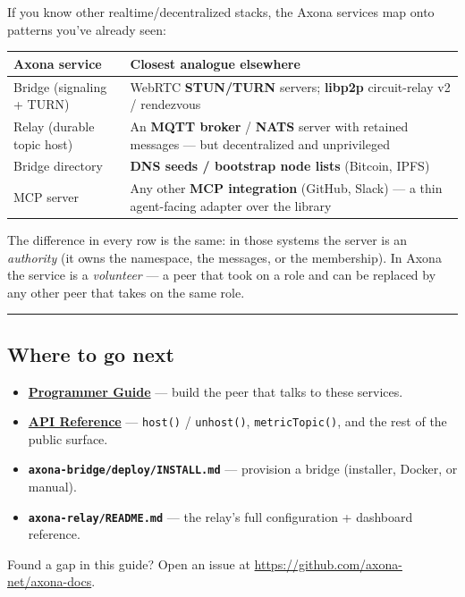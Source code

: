 \documentclass[
  nobib]{tufte-handout}
\newcounter{none} %
\providecommand{\tightlist}{%
  \setlength{\itemsep}{0pt}\setlength{\parskip}{0pt}}
\begin{document}
If you know other realtime/decentralized stacks, the Axona services map
onto patterns you've already seen:

{\def\LTcaptype{none} %
\begin{longtable}[]{@{}
  >{\raggedright\arraybackslash}p{}
  >{\raggedright\arraybackslash}p{}@{}}
\toprule\noalign{}
\begin{minipage}[b]{\linewidth}\raggedright
Axona service
\end{minipage} & \begin{minipage}[b]{\linewidth}\raggedright
Closest analogue elsewhere
\end{minipage} \\
\midrule\noalign{}
\endhead
\bottomrule\noalign{}
\endlastfoot
Bridge (signaling + TURN) & WebRTC \textbf{STUN/TURN} servers;
\textbf{libp2p} circuit-relay v2 / rendezvous \\
Relay (durable topic host) & An \textbf{MQTT broker} / \textbf{NATS}
server with retained messages --- but decentralized and unprivileged \\
Bridge directory & \textbf{DNS seeds / bootstrap node lists} (Bitcoin,
IPFS) \\
MCP server & Any other \textbf{MCP integration} (GitHub, Slack) --- a
thin agent-facing adapter over the library \\
\end{longtable}
}

The difference in every row is the same: in those systems the server is
an \emph{authority} (it owns the namespace, the messages, or the
membership). In Axona the service is a \emph{volunteer} --- a peer that
took on a role and can be replaced by any other peer that takes on the
same role.

\begin{center}\rule{0.5\linewidth}{0.5pt}\end{center}

\subsection{Where to go next}\label{where-to-go-next}

\begin{itemize}
\tightlist
\item
  \textbf{\href{Axona-Programmer-Guide-v4.16.0.md}{Programmer Guide}}
  --- build the peer that talks to these services.
\item
  \textbf{\href{Axona-API-Reference-v4.16.0.md}{API Reference}} ---
  \texttt{host()} / \texttt{unhost()}, \texttt{metricTopic()}, and the
  rest of the public surface.
\item
  \textbf{\texttt{axona-bridge/deploy/INSTALL.md}} --- provision a
  bridge (installer, Docker, or manual).
\item
  \textbf{\texttt{axona-relay/README.md}} --- the relay's full
  configuration + dashboard reference.
\end{itemize}

Found a gap in this guide? Open an issue at
\url{https://github.com/axona-net/axona-docs}.
\end{document}

